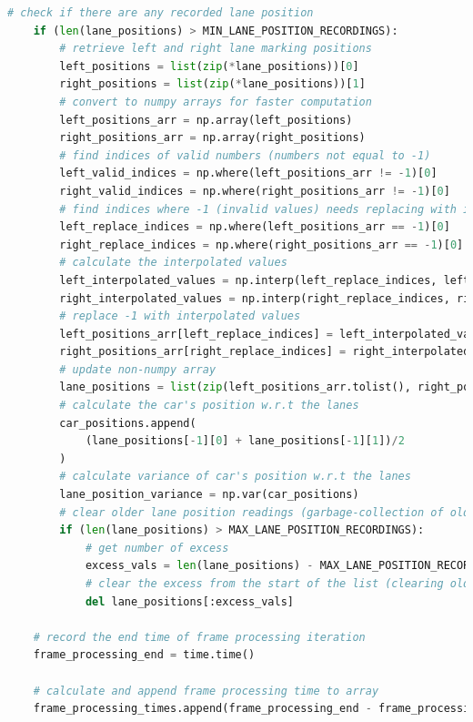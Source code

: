 \documentclass[10pt,conference]{IEEEtran}
\begin{document}
\begin{lstlisting}[language=Python,basicstyle=\tiny, showspaces=false, showstringspaces=false tabsize=1, breaklines=true]
    # check if there are any recorded lane position
    if (len(lane_positions) > MIN_LANE_POSITION_RECORDINGS):
        # retrieve left and right lane marking positions
        left_positions = list(zip(*lane_positions))[0]
        right_positions = list(zip(*lane_positions))[1]
        # convert to numpy arrays for faster computation
        left_positions_arr = np.array(left_positions)
        right_positions_arr = np.array(right_positions)
        # find indices of valid numbers (numbers not equal to -1)
        left_valid_indices = np.where(left_positions_arr != -1)[0]
        right_valid_indices = np.where(right_positions_arr != -1)[0]
        # find indices where -1 (invalid values) needs replacing with interpolated values
        left_replace_indices = np.where(left_positions_arr == -1)[0]
        right_replace_indices = np.where(right_positions_arr == -1)[0]
        # calculate the interpolated values
        left_interpolated_values = np.interp(left_replace_indices, left_valid_indices, left_positions_arr[left_valid_indices])
        right_interpolated_values = np.interp(right_replace_indices, right_valid_indices, right_positions_arr[right_valid_indices])
        # replace -1 with interpolated values
        left_positions_arr[left_replace_indices] = left_interpolated_values
        right_positions_arr[right_replace_indices] = right_interpolated_values
        # update non-numpy array
        lane_positions = list(zip(left_positions_arr.tolist(), right_positions_arr.tolist()))
        # calculate the car's position w.r.t the lanes
        car_positions.append(
            (lane_positions[-1][0] + lane_positions[-1][1])/2
        )
        # calculate variance of car's position w.r.t the lanes
        lane_position_variance = np.var(car_positions)
        # clear older lane position readings (garbage-collection of older recordings)
        if (len(lane_positions) > MAX_LANE_POSITION_RECORDINGS):
            # get number of excess
            excess_vals = len(lane_positions) - MAX_LANE_POSITION_RECORDINGS
            # clear the excess from the start of the list (clearing older excess values)
            del lane_positions[:excess_vals]

    # record the end time of frame processing iteration
    frame_processing_end = time.time()

    # calculate and append frame processing time to array
    frame_processing_times.append(frame_processing_end - frame_processing_start)


\end{lstlisting}
\end{document}
